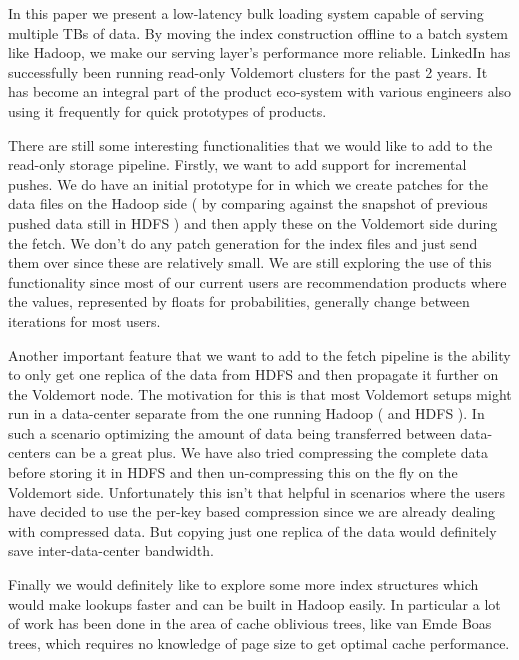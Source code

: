 \documentclass[10pt,twocolumn,preprint,natbib,authoryear]{sigplanconf}
\begin{document}
In this paper we present a low-latency bulk loading system capable of serving multiple TBs of data. By moving the index construction offline to a batch system like Hadoop, we make our serving layer's performance more reliable. LinkedIn has successfully been running read-only Voldemort clusters for the past 2 years. It has become an integral part of the product eco-system with various engineers also using it frequently for quick prototypes of products. 

There are still some interesting functionalities that we would like to add to the read-only storage pipeline. Firstly, we want to add support for incremental pushes. We do have an initial prototype for in which we create patches for the data files on the Hadoop side ( by comparing against the snapshot of previous pushed data still in HDFS ) and then apply these on the Voldemort side during the fetch. We don't do any patch generation for the index files and just send them over since these are relatively small. We are still exploring the use of this functionality since most of our current users are recommendation products where the values, represented by floats for probabilities, generally change between iterations for most users. 

Another important feature that we want to add to the fetch pipeline is the ability to only get one replica of the data from HDFS and then propagate it further on the Voldemort node. The motivation for this is that most Voldemort setups might run in a data-center separate from the one running Hadoop ( and HDFS ). In such a scenario optimizing the amount of data being transferred between data-centers can be a great plus. We have also tried compressing the complete data before storing it in HDFS and then un-compressing this on the fly on the Voldemort side. Unfortunately this isn't that helpful in scenarios where the users have decided to use the per-key based compression since we are already dealing with compressed data. But copying just one replica of the data would definitely save inter-data-center bandwidth. 

Finally we would definitely like to explore some more index structures which would make lookups faster and can be built in Hadoop easily. In particular a lot of work has been done in the area of cache oblivious trees, like van Emde Boas trees, which requires no knowledge of page size to get optimal cache performance. 
 
\acks



    
\end{document}
